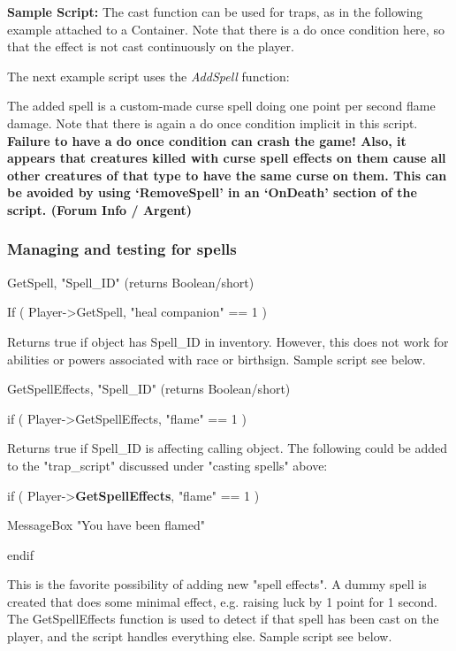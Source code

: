 \documentclass[
]{article}
\begin{document}
\textbf{Sample Script:} The cast function can be used for traps, as in
the following example attached to a Container. Note that there is a do
once condition here, so that the effect is not cast continuously on the
player.



The next example script uses the \emph{AddSpell} function:



The added spell is a custom-made curse spell doing one point per second
flame damage. Note that there is again a do once condition implicit in
this script. \textbf{Failure to have a do once condition can crash the
game! Also, it appears that creatures killed with curse spell effects on
them cause all other creatures of that type to have the same curse on
them. This can be avoided by using `RemoveSpell' in an `OnDeath' section
of the script. (Forum Info / Argent)}

\hypertarget{managing-and-testing-for-spells}{%
\subsubsection{Managing and testing for
spells}\label{managing-and-testing-for-spells}}

GetSpell, "Spell\_ID" (returns Boolean/short)

If ( Player-\textgreater GetSpell, "heal companion" == 1 )

Returns true if object has Spell\_ID in inventory. However, this does
not work for abilities or powers associated with race or birthsign.
Sample script see below.

GetSpellEffects, "Spell\_ID" (returns Boolean/short)

if ( Player-\textgreater GetSpellEffects, "flame" == 1 )

Returns true if Spell\_ID is affecting calling object. The following
could be added to the "trap\_script" discussed under "casting spells"
above:

if ( Player-\textgreater{}\textbf{GetSpellEffects}, "flame" == 1 )

MessageBox "You have been flamed"

endif

This is the favorite possibility of adding new "spell effects". A dummy
spell is created that does some minimal effect, e.g. raising luck by 1
point for 1 second. The GetSpellEffects function is used to detect if
that spell has been cast on the player, and the script handles
everything else. Sample script see below.
\end{document}

